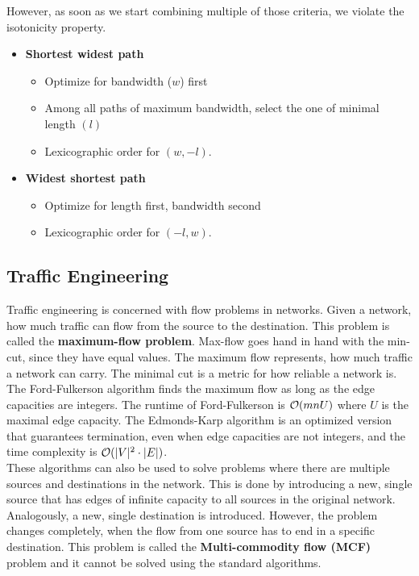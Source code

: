However, as soon as we start combining multiple of those criteria, we violate the isotonicity property.
\begin{itemize}
\item \textbf{Shortest widest path}
\begin{itemize}
\item Optimize for bandwidth ($w$) first
\item Among all paths of maximum bandwidth, select the one of minimal length $(l)$
\item Lexicographic order for $(w, -l)$.
\end{itemize}
\item \textbf{Widest shortest path}
\begin{itemize}
\item Optimize for length first, bandwidth second
\item Lexicographic order for $(-l, w)$.
\end{itemize}
\end{itemize}

\subsection{Traffic Engineering}
Traffic engineering is concerned with flow problems in networks. Given a network, how much traffic can flow from the source to the destination. This problem is called the \textbf{maximum-flow problem}. Max-flow goes hand in hand with the min-cut, since they have equal values. The maximum flow represents, how much traffic a network can carry. The minimal cut is a metric for how reliable a network is. The Ford-Fulkerson algorithm finds the maximum flow as long as the edge capacities are integers. The runtime of Ford-Fulkerson is $\mathcal{O} (mnU)$ where $U$ is the maximal edge capacity. The Edmonds-Karp algorithm is an optimized version that guarantees termination, even when edge capacities are not integers, and the time complexity is $\mathcal{O} (|V|^2 \cdot |E|)$.\vspace{.3cm}\\

These algorithms can also be used to solve problems where there are multiple sources and destinations in the network. This is done by introducing a new, single source that has edges of infinite capacity to all sources in the original network. Analogously, a new, single destination is introduced. However, the problem changes completely, when the flow from one source has to end in a specific destination. This problem is called the \textbf{Multi-commodity flow (MCF)} problem and it cannot be solved using the standard algorithms.\vspace{.3cm}\\


